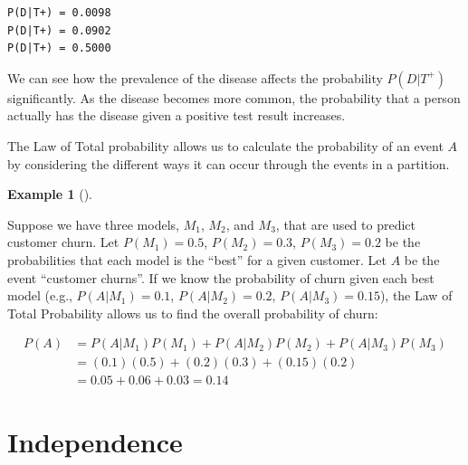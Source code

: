\documentclass[
  letterpaper,
  DIV=11,
  numbers=noendperiod]{scrreport}
\theoremstyle{definition}
\newtheorem{example}{Example}[chapter]
\theoremstyle{plain}
\theoremstyle{definition}
\theoremstyle{plain}
\theoremstyle{remark}
\begin{document}
\begin{verbatim}
P(D|T+) = 0.0098
P(D|T+) = 0.0902
P(D|T+) = 0.5000
\end{verbatim}

We can see how the prevalence of the disease affects the probability
\(P(D|T^+)\) significantly. As the disease becomes more common, the
probability that a person actually has the disease given a positive test
result increases.

The Law of Total probability allows us to calculate the probability of
an event \(A\) by considering the different ways it can occur through
the events in a partition.

\begin{tcolorbox}[enhanced jigsaw, breakable, opacityback=0, leftrule=.75mm, colback=white, bottomtitle=1mm, coltitle=black, toptitle=1mm, titlerule=0mm, bottomrule=.15mm, colframe=quarto-callout-note-color-frame, title={Customer churn}, opacitybacktitle=0.6, colbacktitle=quarto-callout-note-color!10!white, rightrule=.15mm, arc=.35mm, toprule=.15mm, left=2mm]

\begin{example}[]\protect\hypertarget{exm-total-probability-data-science}{}\label{exm-total-probability-data-science}

Suppose we have three models, \(M_1\), \(M_2\), and \(M_3\), that are
used to predict customer churn. Let \(P(M_1)=0.5\), \(P(M_2)=0.3\),
\(P(M_3)=0.2\) be the probabilities that each model is the ``best'' for
a given customer. Let \(A\) be the event ``customer churns''. If we know
the probability of churn given each best model (e.g., \(P(A|M_1)=0.1\),
\(P(A|M_2)=0.2\), \(P(A|M_3)=0.15\)), the Law of Total Probability
allows us to find the overall probability of churn:

\[
\begin{aligned}
P(A) &= P(A|M_1)P(M_1) + P(A|M_2)P(M_2) + P(A|M_3)P(M_3) \\
&= (0.1)(0.5) + (0.2)(0.3) + (0.15)(0.2)\\
& = 0.05 + 0.06 + 0.03 = 0.14
\end{aligned}
\]

\end{example}

\end{tcolorbox}

\section{Independence}\label{independence}
\end{document}
